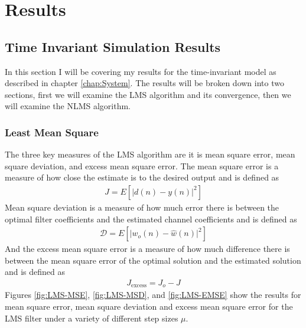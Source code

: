 \chapter{Results}
\label{chap:Results}
\section{Time Invariant Simulation Results}
In this section I will be covering my results for the time-invariant %
model as described in chapter \ref{chap:System}. The results will be %
broken down into two sections, first we will examine the %
LMS algorithm and its convergence, then we will examine the NLMS %
algorithm.

\subsection{Least Mean Square}
\FloatBarrier
The three key measures of the LMS algorithm are it is mean square %
error, mean square deviation, and excess mean square error. %
The mean square error is a measure of how close the estimate %
is to the desired output and is defined as 
\begin{align}
	J = E\left[ \lvert d(n) - y(n) \rvert^{2} \right]
\end{align}
Mean square deviation is a measure of how much error there is %
between the optimal filter coefficients and the estimated %
channel coefficients and is defined as
\begin{align}
	\mathscr{D} = E\left[ \lvert w_{o}(n) - \hat{w}(n) \rvert^{2} \right]
\end{align}
And the excess mean square error is a measure of how much %
difference there is between the mean square error of the %
optimal solution and the estimated solution and is defined as
\begin{align}
	J_{\text{excess}} = J_{o} - J
\end{align}
Figures \ref{fig:LMS-MSE}, \ref{fig:LMS-MSD}, and \ref{fig:LMS-EMSE} %
show the results for mean square error, mean square deviation and %
excess mean square error for the LMS filter under a variety of %
different step sizes $\mu$.

